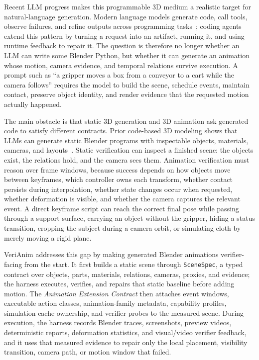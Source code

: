 \documentclass{article}
\newcommand{\code}[1]{\texttt{#1}}
\begin{document}
Recent LLM progress makes this programmable 3D medium a realistic target for natural-language generation. Modern language models generate code, call tools, observe failures, and refine outputs across programming tasks~\citep{chen2021evaluating,austin2021program,yao2023react,schick2023toolformer,madaan2023selfrefine,shinn2023reflexion}; coding agents extend this pattern by turning a request into an artifact, running it, and using runtime feedback to repair it. The question is therefore no longer whether an LLM can write some Blender Python, but whether it can generate an animation whose motion, camera evidence, and temporal relations survive execution. A prompt such as ``a gripper moves a box from a conveyor to a cart while the camera follows'' requires the model to build the scene, schedule events, maintain contact, preserve object identity, and render evidence that the requested motion actually happened.

The main obstacle is that static 3D generation and 3D animation ask generated code to satisfy different contracts. Prior code-based 3D modeling shows that LLMs can generate static Blender programs with inspectable objects, materials, cameras, and layouts~\citep{lu2025verianim}. Static verification can inspect a finished scene: the objects exist, the relations hold, and the camera sees them. Animation verification must reason over frame windows, because success depends on how objects move between keyframes, which controller owns each transform, whether contact persists during interpolation, whether state changes occur when requested, whether deformation is visible, and whether the camera captures the relevant event. A direct keyframe script can reach the correct final pose while passing through a support surface, carrying an object without the gripper, hiding a status transition, cropping the subject during a camera orbit, or simulating cloth by merely moving a rigid plane.

VeriAnim addresses this gap by making generated Blender animations verifier-facing from the start. It first builds a static scene through \code{SceneSpec}, a typed contract over objects, parts, materials, relations, cameras, proxies, and evidence; the harness executes, verifies, and repairs that static baseline before adding motion. The \emph{Animation Extension Contract} then attaches event windows, executable action classes, animation-family metadata, capability profiles, simulation-cache ownership, and verifier probes to the measured scene. During execution, the harness records Blender traces, screenshots, preview videos, deterministic reports, deformation statistics, and visual/video verifier feedback, and it uses that measured evidence to repair only the local placement, visibility transition, camera path, or motion window that failed.
\end{document}
